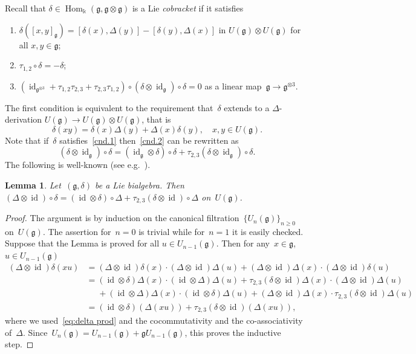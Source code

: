 \documentclass[12pt, reqno]{amsart}
\newtheorem{lemma}[theorem]{Lemma}
\theoremstyle{definition}
\numberwithin{equation}{section}
\newcommand{\tensor}{\otimes}
\newcommand{\kk}{\mathbb{k}}\newcommand{\lie}[1]{{\mathfrak{#1}}}
\DeclareMathOperator{\id}{id}
\DeclareMathOperator{\Hom}{Hom}
\begin{document}
Recall that $\delta\in\Hom_\kk(\lie g,\lie g\tensor \lie g)$ is a Lie {\em cobracket} 
if it satisfies 
\begin{enumerate}[label={($LB_\arabic*$)}]
\item\label{cnd.3} $\delta([x,y]_{\lie g})=[\delta(x),\Delta(y)]-[\delta(y),\Delta(x)]
$ in $U(\lie g)\tensor U(\lie g)$
for all $x,y\in\lie g$;
\item\label{cnd.1} $\tau_{1,2}\circ\delta=-\delta$;
\item\label{cnd.2} $(\id_{\lie g^{\tensor 3}}+\tau_{1,2}\tau_{2,3}+\tau_{2,3}\tau_{1,2})\circ (\delta\tensor\id_{\lie g})\circ \delta=0$
as a linear map~$\lie g\to \lie g^{\tensor 3}$.
\end{enumerate}
The first condition is equivalent to the requirement that~$\delta$ extends to a $\Delta$-derivation
$U(\lie g)\to U(\lie g)\tensor U(\lie g)$,
that is
\begin{equation}\label{eq:delta prod}
\delta(x y)=\delta(x)\Delta(y)+\Delta(x)\delta(y),\quad x,y\in U(\lie g).
\end{equation}
Note that if~$\delta$ satisfies~\ref{cnd.1}
then~\ref{cnd.2} can be rewritten as 
\begin{equation}\label{eq:equiv coJacobi}
(\delta\tensor\id_{\lie g})\circ \delta =
(\id_{\lie g}\tensor\delta)\circ\delta+
\tau_{2,3}(\delta\tensor\id_{\lie g})\circ\delta.
\end{equation}
The following is well-known (see e.g.~\cite{CPbook}).
\begin{lemma}\label{lem:coLeib}
Let~$(\lie g,\delta)$ be a Lie bialgebra. Then 
$(\Delta\tensor\id)\circ\delta=(\id\tensor\delta)\circ\Delta+
\tau_{2,3}(\delta\tensor\id)\circ\Delta$ on~$U(\lie g)$.
\end{lemma}
\begin{proof}
The argument is by induction on the canonical filtration~$\{U_n(\lie g)\}_{n\ge 0}$ on~$U(\lie g)$. The assertion for~$n=0$ is trivial while for~$n=1$ it is easily checked. Suppose that the Lemma is proved for all
$u\in U_{n-1}(\lie g)$. Then for any~$x\in\lie g$, $u\in U_{n-1}(\lie g)$
\begin{align*}
(\Delta\tensor\id)\delta(xu)&=(\Delta\tensor\id)\delta(x)\cdot (\Delta\tensor\id)\Delta(u)+(\Delta\tensor\id)\Delta(x)\cdot 
(\Delta\tensor\id)\delta(u)\\
&=(\id\tensor\delta)\Delta(x)\cdot (\id\tensor\Delta)\Delta(u)+
\tau_{2,3}(\delta\tensor\id)\Delta(x)\cdot(\Delta\tensor\id)\Delta(u)\\
&\phantom{=}+
(\id\tensor\Delta)\Delta(x)\cdot 
(\id\tensor \delta)\Delta(u)+
(\Delta\tensor\id)\Delta(x)\cdot 
\tau_{2,3}(\delta\tensor \id)\Delta(u)\\
&=(\id\tensor\delta)(\Delta(xu))+\tau_{2,3}(\delta\tensor\id)(\Delta(xu)),
\end{align*}
where we used~\eqref{eq:delta prod} and the cocommutativity and the co-associativity of~$\Delta$. Since~$U_n(\lie g)=U_{n-1}(\lie g)+\lie gU_{n-1}(\lie g)$, this proves the inductive step.
\end{proof}
\end{document}
